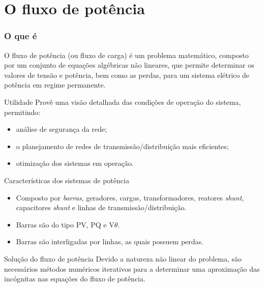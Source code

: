 \documentclass[10pt]{beamer}
\begin{document}
\section{O fluxo de potência}

\begin{frame}[fragile]
  \frametitle{O que é}
  \justify
     O fluxo de potência (ou fluxo de carga) é um problema matemático, composto por um conjunto de equações algébricas não lineares, que permite determinar os valores de tensão e potência, bem como as perdas, para um sistema elétrico de potência em regime permanente.

\end{frame}

\begin{frame}{Utilidade}
    \justify
    Provê uma visão detalhada das condições de operação do sistema, permitindo:
    
    \begin{itemize}
        \item análise de segurança da rede;
        
        \item o planejamento de redes de transmissão/distribuição mais eficientes;
        
        \item otimização dos sistemas em operação.
       \end{itemize}
\end{frame}

\begin{frame}{Características dos sistemas de potência}
    \begin{itemize}
        \item Composto por \emph{barras}, geradores, cargas, transformadores, reatores \textit{shunt}, capacitores \textit{shunt} e linhas de transmissão/distribuição.
        
        \item Barras são do tipo PV, PQ e V$\theta$.
        
        \item Barras são interligadas por linhas, as quais possuem perdas.
    \end{itemize}
\end{frame}

\begin{frame}{Solução do fluxo de potência}
    \justify
    Devido a natureza não linear do problema, são necessários métodos numéricos iterativos para a determinar uma aproximação das incógnitas nas equações do fluxo de potência.
\end{frame}
\end{document}
